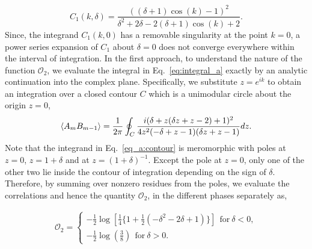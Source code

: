 \documentclass[aps,prx,twocolumn]{revtex4-2}
\begin{document}
{{\begin{equation}
	C_1(k,\delta)=\frac{((\delta +1) \cos (k)-1)^2}{\delta ^2+2 \delta -2 (\delta +1) \cos (k)+2}.
\end{equation}
Since, the integrand $C_1(k,0)$ has a removable singularity at the point $k=0$, a power series expansion of $C_1$ about $\delta=0$ does not converge everywhere within the interval of integration. In the first approach, to understand the nature of the function $\mathcal{O}_2$, we evaluate the integral in Eq.~\eqref{eq:integral_a} exactly by an analytic continuation into the complex plane. Specifically, we substitute $z=e^{ik}$ to obtain an integration over a closed contour $C$ which is a unimodular circle about the origin $z=0$,
\begin{equation}\label{eq_a:contour}
	\braket{A_mB_{m-1}}=\frac{1}{2\pi}\oint_C\frac{i (\delta +z (\delta  z+z-2)+1)^2}{4 z^2 (-\delta +z-1) (\delta  z+z-1)}dz.
\end{equation}
Note that the integrand in Eq.~\eqref{eq_a:contour} is meromorphic with poles at $z=0$, $z=1+\delta$ and at $z=(1+\delta)^{-1}$. Except the pole at $z=0$, only one of the other two lie inside the contour of integration depending on the sign of $\delta$. Therefore, by summing over nonzero residues from the poles, we evaluate the correlations and hence the quantity $\mathcal{O}_2$, in the different phases separately as,\\

\begin{widetext}
	\begin{eqnarray}
		\mathcal{O}_2=
		\begin{cases}
			-\frac{1}{2} \log \left[\frac{1}{4} \{1+\frac{1}{2} \left(-\delta ^2-2 \delta +1\right)\}\right]~~\text{for}~\delta<0,\\
			-\frac{1}{2} \log\left(\frac{3}{8}\right)~~\text{for}~\delta>0.
		\end{cases}
	\end{eqnarray}
\end{widetext}
\begin{figure*}
	\hspace{1cm}
	

\end{figure*}}}
\end{document}
